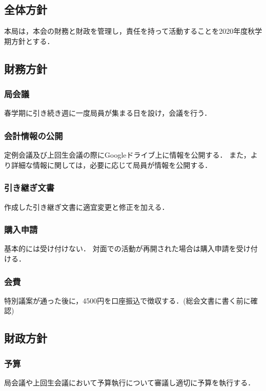 \subsection*{全体方針}



本局は，本会の財務と財政を管理し，責任を持って活動することを2020年度秋学期方針とする．


\subsection*{財務方針}

\subsubsection*{局会議}
春学期に引き続き週に一度局員が集まる日を設け，会議を行う．

\subsubsection*{会計情報の公開}
定例会議及び上回生会議の際にGoogleドライブ上に情報を公開する．
また，より詳細な情報に関しては，必要に応じて局員が情報を公開する．

\subsubsection*{引き継ぎ文書}
作成した引き継ぎ文書に適宜変更と修正を加える．

\subsubsection*{購入申請}
基本的には受け付けない．
対面での活動が再開された場合は購入申請を受け付ける．

\subsubsection*{会費}
特別議案が通った後に，4500円を口座振込で徴収する．(総会文書に書く前に確認)


\subsection*{財政方針}

\subsubsection*{予算}
局会議や上回生会議において予算執行について審議し適切に予算を執行する．

